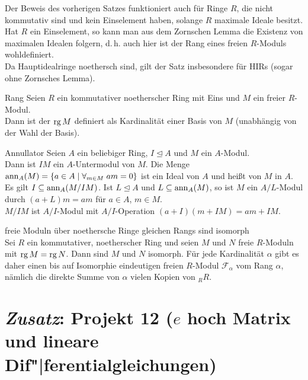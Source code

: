 \begin{Bem}
    Der Beweis des vorherigen Satzes funktioniert auch für Ringe $R$, die
    nicht kommutativ sind und kein Einselement haben, solange $R$ maximale
    Ideale besitzt. \\
    Hat $R$ ein Einselement, so kann man aus dem Zornschen Lemma die Existenz
    von maximalen Idealen folgern, d.\,h. auch hier ist der Rang eines freien
    $R$-Moduls wohldefiniert. \\
    Da Hauptidealringe noethersch sind, gilt der Satz insbesondere für HIRs
    (sogar ohne Zornsches Lemma).
\end{Bem}

\begin{Def}{Rang}
    Seien $R$ ein kommutativer noetherscher Ring mit Eins und $M$ ein
    freier $R$-Modul. \\
    Dann ist der  $\operatorname{rg} M$ definiert als Kardinalität einer
    Basis von $M$ (unabhängig von der Wahl der Basis).
\end{Def}

\begin{Lemma}{Annullator}
    Seien $A$ ein beliebiger Ring, $I \trianglelefteq A$ und $M$ ein
    $A$-Modul. \\
    Dann ist $I M$ ein $A$-Untermodul von $M$.
    Die Menge $\operatorname{ann}_A(M) = \{a \in A \;|\; \forall_{m \in M}\; am = 0\}$
    ist ein Ideal von $A$ und heißt  von $M$ in $A$.
    Es gilt $I \subseteq \operatorname{ann}_A(M/IM)$.
    Ist $L \trianglelefteq A$ und $L \subseteq \operatorname{ann}_A(M)$, so ist
    $M$ ein $A/L$-Modul durch $(a + L)m = am$ für $a \in A$, $m \in M$. \\
    $M/IM$ ist $A/I$-Modul mit $A/I$-Operation
    $(a + I)(m + IM) = am + IM$.
\end{Lemma}

\begin{Satz}{freie Moduln über noethersche Ringe gleichen Rangs sind
             isomorph} \\
    Sei $R$ ein kommutativer, noetherscher Ring und seien $M$ und $N$
    freie $R$-Moduln mit $\operatorname{rg} M = \operatorname{rg} N$.
    Dann sind $M$ und $N$ isomorph.
    Für jede Kardinalität $\alpha$ gibt es daher einen bis auf Isomorphie
    eindeutigen freien $R$-Modul $\mathcal{F}_\alpha$ vom Rang $\alpha$,
    nämlich die direkte Summe von $\alpha$ vielen Kopien von ${}_R R$.
\end{Satz}

\pagebreak

\section{%
    \emph{Zusatz}: Projekt 12 (\texorpdfstring{$e$}{ℯ} hoch Matrix und
    lineare Dif"|ferentialgleichungen)%
}

